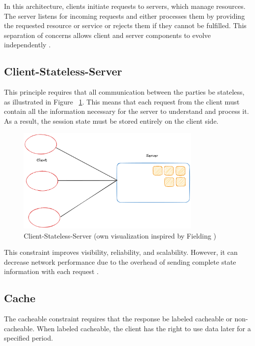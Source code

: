 In this architecture, clients initiate requests to servers, which manage resources. The server listens for incoming requests and either processes them by providing the requested resource or service or rejects them if they cannot be fulfilled. This separation of concerns allows client and server components to evolve independently \cite{sinha1992}.

\subsection{Client-Stateless-Server}

This principle requires that all communication between the parties be stateless, as illustrated in Figure ~\ref{fig:stateless}. This means that each request from the client must contain all the information necessary for the server to understand and process it\cite{MESBAH20082194}. As a result, the session state must be stored entirely on the client side.\cite[Section 3.4.1.]{fielding2000}

\begin{figure}[!h]
\centering
\includegraphics[width=0.8\textwidth, keepaspectratio]{figures/stateless.png}
\caption{Client-Stateless-Server (own visualization inspired by Fielding \cite{fielding2000})}
\label{fig:stateless}
\end{figure}

This constraint improves visibility, reliability, and scalability. However, it can decrease network performance due to the overhead of sending complete state information with each request \cite[Section 5.1.3]{fielding2000}.

\subsection{Cache}

The cacheable constraint requires that the response be labeled cacheable or non-cacheable. When labeled cacheable, the client has the right to use data later for a specified period.

